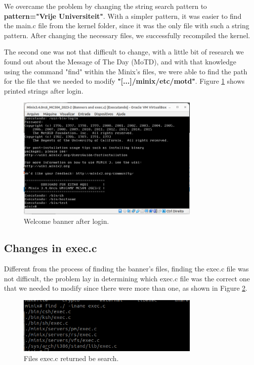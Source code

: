 We overcame the problem by changing the string search pattern to \textbf{pattern="Vrije Universiteit"}. With a simpler pattern, it was easier to find the main.c file from the kernel folder, since it was the only file with such a string pattern. After changing the necessary files, we successfully recompiled the kernel.  

The second one was not that difficult to change, with a little bit of research we found out about the Message of The Day (MoTD), and with that knowledge using the command "find" within the Minix's files, we were able to find the path for the file that we needed to modify \textbf{"[...]/minix/etc/motd"}. Figure \ref{fig-welcome} shows printed strings after login.

\begin{figure}[h!]
\centering
\includegraphics[width=3.5in, trim={0 0.5in 0 3.5in},clip]{photo/welcome.png}
\caption{Welcome banner after login.}
\label{fig-welcome}
\end{figure}

\newpage

\subsection{Changes in exec.c}\label{exec}
Different from the process of finding the banner's files, finding the exec.c file was not difficult, the problem lay in determining which exec.c file was the correct one that we needed to modify since there were more than one, as shown in Figure \ref{fig-exec}.

\begin{figure}[htbp]
\centering
\includegraphics[width=3.5in]{photo/exec_c_search.png}
\caption{Files exec.c returned be search.}
\label{fig-exec}
\end{figure}

